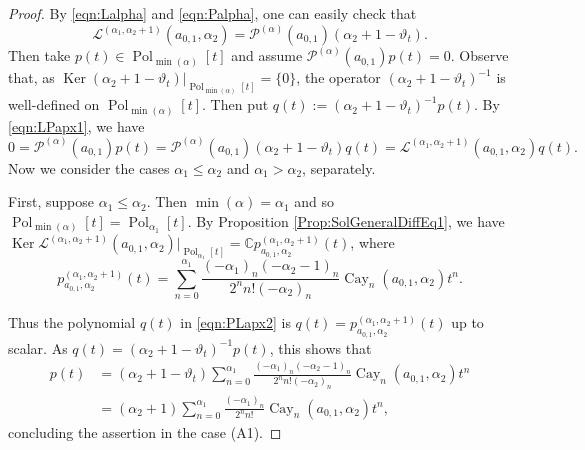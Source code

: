 \documentclass[a4paper,11pt,reqno]{amsart}
\newcommand{\CC}{\mathbb{C}}
\newcommand{\calL}{\mathcal{L}}
\newcommand{\calP}{\mathcal{P}}
\newcommand{\0}{{\bf 0}}
\newcommand{\1}{{\bf 1}}
\DeclareMathOperator{\Cay}{Cay}
\DeclareMathOperator{\Pol}{Pol}
\DeclareMathOperator{\Ker}{Ker}
\theoremstyle{plain}
\theoremstyle{definition}
\numberwithin{equation}{section}
\theoremstyle{definition}
\begin{document}
\begin{proof}
By
\eqref{eqn:Lalpha}
and
\eqref{eqn:Palpha},
one can easily check that 
\begin{equation}\label{eqn:LPapx1}
\calL^{(\alpha_1,\alpha_2+1)}(a_{0,1},\alpha_2)
=\calP^{(\alpha)}(a_{0,1})(\alpha_2+1-\vartheta_t).
\end{equation}
Then take $p(t) \in \Pol_{\min(\alpha)}[t]$ and 
assume $\calP^{(\alpha)}(a_{0,1})p(t)=0$.
Observe that, as $\Ker(\alpha_2+1-\vartheta_t)\big\vert_{\Pol_{\min(\alpha)}[t]}=\{0\}$, 
the operator
$(\alpha_2+1-\vartheta_t)^{-1}$ is well-defined on $\Pol_{\min(\alpha)}[t]$. 
Then put $q(t) := (\alpha_2+1-\vartheta_t)^{-1}p(t)$. 
By \eqref{eqn:LPapx1}, we have
\begin{equation}\label{eqn:PLapx2}
0=\calP^{(\alpha)}(a_{0,1})p(t)
=\calP^{(\alpha)}(a_{0,1})(\alpha_2+1-\vartheta_t)q(t)
=\calL^{(\alpha_1,\alpha_2+1)}(a_{0,1},\alpha_2)q(t).
\end{equation}
Now we consider the cases $\alpha_1 \leq \alpha_2$ and $\alpha_1 > \alpha_2$,
separately.

First, suppose $\alpha_1 \leq \alpha_2$. Then 
$\min(\alpha) = \alpha_1$ and so $\Pol_{\min(\alpha)}[t]= \Pol_{\alpha_1}[t]$.
By Proposition \ref{Prop:SolGeneralDiffEq1}, we have
$\Ker\calL^{(\alpha_1,\alpha_2+1)}(a_{0,1},\alpha_2)\big\vert_{\Pol_{\alpha_1}[t]}
=\CC p^{(\alpha_1,\alpha_2+1)}_{a_{0,1},\alpha_2}(t)$,
where
\begin{equation*}
p^{(\alpha_1,\alpha_2+1)}_{a_{0,1},\alpha_2}(t)
=\sum_{n=0}^{\alpha_1} 
\frac{(-\alpha_1)_n(-\alpha_2-1)_n}{2^nn!(-\alpha_2)_n}\Cay_n(a_{0,1},\alpha_2)t^n.
\end{equation*}

Thus the polynomial $q(t)$ in \eqref{eqn:PLapx2} is
$q(t) = p^{(\alpha_1,\alpha_2+1)}_{a_{0,1},\alpha_2}(t)$ up to scalar.
As $q(t) = (\alpha_2+1-\vartheta_t)^{-1}p(t)$, this shows that
\begin{align*}
p(t)
&=(\alpha_2+1-\vartheta_t)\sum_{n=0}^{\alpha_1} 
\frac{(-\alpha_1)_n(-\alpha_2-1)_n}{2^nn!(-\alpha_2)_n}\Cay_n(a_{0,1},\alpha_2)t^n\\
&=(\alpha_2+1)\sum_{n=0}^{\alpha_1} 
\frac{(-\alpha_1)_n}{2^nn!}
\Cay_n(a_{0,1},\alpha_2)t^n,
\end{align*}
concluding the assertion in the case (A1).


\end{proof}
\end{document}
